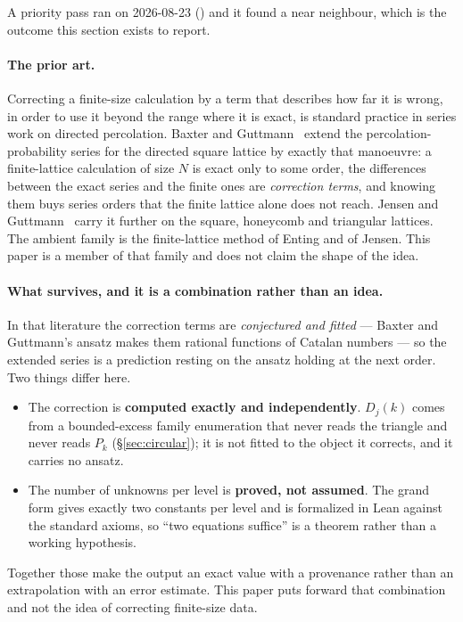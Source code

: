 \documentclass[11pt]{article}
\begin{document}
A priority pass ran on 2026-08-23 ()
and it found a near neighbour, which is the outcome this section exists to
report.

\paragraph{The prior art.} Correcting a finite-size calculation by a term that
describes how far it is wrong, in order to use it beyond the range where it is
exact, is standard practice in series work on directed percolation. Baxter and
Guttmann~\cite{baxter1988} extend the percolation-probability series for the
directed square lattice by exactly that manoeuvre: a finite-lattice calculation
of size $N$ is exact only to some order, the differences between the exact
series and the finite ones are \emph{correction terms}, and knowing them buys
series orders that the finite lattice alone does not reach. Jensen and
Guttmann~\cite{jensen1995} carry it further on the square, honeycomb and
triangular lattices. The ambient family is the finite-lattice method of Enting
and of Jensen. This paper is a member of that family and does not claim the
shape of the idea.

\paragraph{What survives, and it is a combination rather than an idea.} In that
literature the correction terms are \emph{conjectured and fitted} --- Baxter and
Guttmann's ansatz makes them rational functions of Catalan numbers --- so the
extended series is a prediction resting on the ansatz holding at the next
order. Two things differ here.

\begin{itemize}
\item The correction is \textbf{computed exactly and independently}. $D_j(k)$
comes from a bounded-excess family enumeration that never reads the triangle and
never reads $P_k$ (\S\ref{sec:circular}); it is not fitted to the object it
corrects, and it carries no ansatz.
\item The number of unknowns per level is \textbf{proved, not assumed}. The
grand form gives exactly two constants per level and is formalized in Lean
against the standard axioms, so ``two equations suffice'' is a theorem rather
than a working hypothesis.
\end{itemize}

Together those make the output an exact value with a provenance rather than an
extrapolation with an error estimate. This paper puts forward that combination
and not the idea of correcting finite-size data.
\end{document}
